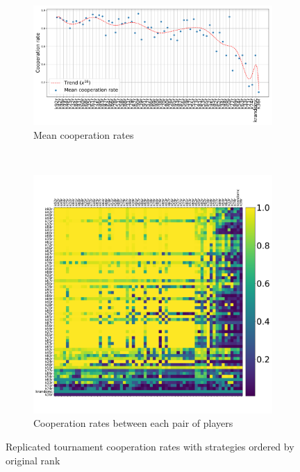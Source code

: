 \documentclass{article}
\begin{document}
\begin{figure}[!hbtp]
    \begin{subfigure}{.6\textwidth}
        \centering
        \includegraphics[width=.9\textwidth]{assets/original_tournament_cooperation_rate_versus_rank.pdf}
        \caption{Mean cooperation rates}
        \label{fig:original_tournament_cooperation_rate_versus_rank}
    \end{subfigure}%
    ~
    \begin{subfigure}{.4\textwidth}
        \centering
        \includegraphics[width=.9\textwidth]{assets/original_tournament_pairwise_cooperation_rates.pdf}
        \caption{Cooperation rates between each pair of players}
        \label{fig:original_tournament_pairwise_cooperation_rates}
    \end{subfigure}
    \caption{Replicated tournament cooperation rates with strategies
             ordered by original rank}
    \label{fig:replicated_cooperation_rates}
\end{figure}
\end{document}
